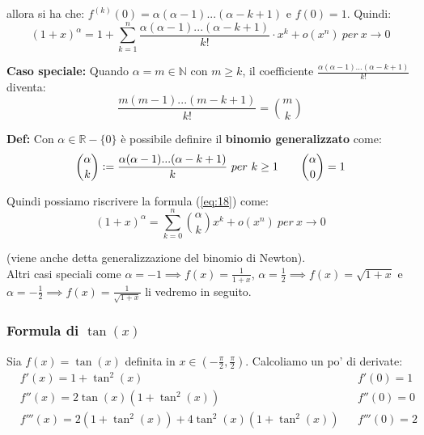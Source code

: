 \documentclass{article}
\begin{document}
\noindent allora si ha che: $f^{(k)}(0) = \alpha(\alpha - 1)...(\alpha - k + 1)$ e $f(0) = 1$. Quindi:
\begin{equation}
    (1 + x)^\alpha = 1 + \sum_{k = 1}^n \frac{\alpha(\alpha - 1)...(\alpha - k + 1)}{k!} \cdot x^k + o(x^n) \ per \ x \to 0
    \label{eq:18}
\end{equation}

\noindent\textbf{Caso speciale: } Quando $\alpha = m \in \mathbb{N}$ con $m \geq k$, il coefficiente $\frac{\alpha(\alpha - 1)...(\alpha - k + 1)}{k!}$ diventa:
\begin{equation*}
    \frac{m(m - 1)...(m - k + 1)}{k!} = \binom{m}k{}
\end{equation*}

\noindent\textbf{Def:} Con $\alpha \in \mathbb{R} - \{0\}$ è possibile definire il \textbf{binomio generalizzato} come:
\begin{equation*}
    \binom{\alpha}{k} \vcentcolon = \frac{\alpha(\alpha - 1)...(\alpha - k + 1)}{k} \ per \ k \geq 1 \qquad \binom{\alpha}{0} = 1
\end{equation*}

\noindent Quindi possiamo riscrivere la formula (\ref{eq:18}) come:
\begin{equation*}
    (1 + x)^\alpha = \sum_{k = 0}^n \binom{\alpha}{k} x^k + o(x^n) \ per \ x \to 0
\end{equation*}

\noindent (viene anche detta generalizzazione del binomio di Newton).\\

\noindent Altri casi speciali come $\alpha = -1 \implies f(x) = \frac{1}{1 + x}$, $\alpha = \frac{1}{2} \implies f(x) = \sqrt{1 + x}$ e $\alpha = -\frac{1}{2} \implies f(x) = \frac{1}{\sqrt{1 + x}}$ li vedremo in seguito.

\subsubsection{Formula di $\tan(x)$}
Sia $f(x) = \tan(x)$ definita in $x \in (-\frac{\pi}{2}, \frac{\pi}{2})$. Calcoliamo un po' di derivate:
\begin{align*}
    & f'(x) = 1 + \tan^2(x) && f'(0) = 1 \\
    & f''(x) = 2\tan(x)(1 + \tan^2(x)) && f''(0) = 0 \\
    & f'''(x) = 2(1 + \tan^2(x)) + 4\tan^2(x)(1 + \tan^2(x)) && f'''(0) = 2 \\
\end{align*}
\end{document}
